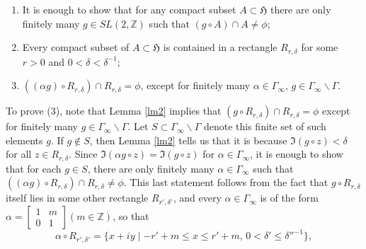 \documentclass[12pt]{article} %
\begin{document}
\begin{enumerate}
  \item It is enough to show that for any compact subset $A \subset \mathfrak{H}$ there are only finitely many $g \in SL(2, \mathbb{Z})$ such that $(g \circ A) \cap A \neq \phi$;

  \item Every compact subset of $A \subset \mathfrak{H}$ is contained in a rectangle $R_{r,\delta}$ for some $r > 0$ and $0 < \delta < \delta^{-1}$;

  \item $((\alpha g) \circ R_{r,\delta}) \cap R_{r,\delta} = \phi$, except for finitely many $\alpha \in \Gamma_{\infty}$, $g \in \Gamma_{\infty}\backslash \Gamma$.
\end{enumerate}

To prove (3), note that Lemma \ref{lm2} implies that $(g \circ R_{r,\delta}) \cap R_{r,\delta} = \phi$ except for finitely many $g \in \Gamma_{\infty}\backslash \Gamma$. Let $S \subset \Gamma_{\infty}\backslash \Gamma$ denote this finite set of such elements $g$. If $g \not\in S$, then Lemma \ref{lm2} tells us that it is because $\Im(g \circ z) < \delta$ for all $z \in R_{r,\delta}$. Since $\Im(\alpha g \circ z) = \Im(g \circ z)$ for $\alpha \in \Gamma_{\infty}$, it is enough to show that for each $g \in S$, there are only finitely many $\alpha \in \Gamma_{\infty}$ such that $((\alpha g) \circ R_{r,\delta}) \cap R_{r,\delta} \neq \phi$. This last statement follows from the fact that $g \circ R_{r,\delta}$ itself lies in some other rectangle $R_{r',\delta'}$, and every $\alpha \in \Gamma_{\infty}$ is of the form $\alpha =
  \begin{bmatrix}
    1 & m \\
    0 & 1
  \end{bmatrix}
  (m \in \mathbb{Z})$, so that
\[
  \alpha \circ R_{r',\delta'} = \{x + iy \mid -r' + m \leq x \leq r' + m, \, 0 < \delta' \leq \delta''^{-1}\},
\]
\end{document}
